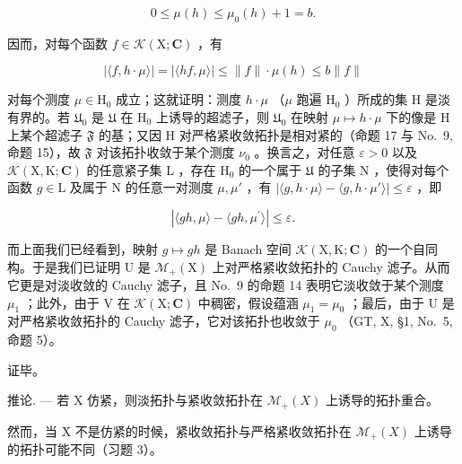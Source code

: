 \[
0 \leqslant \mu (h) \leqslant \mu_ {0} (h) + 1 = b.
\]

因而，对每个函数 \(f \in \mathcal{K}(\mathrm{X};\mathbf{C})\) ，有

\[
| \langle f, h \cdot \mu \rangle | = | \langle h f, \mu \rangle | \leqslant \| f \| \cdot \mu (h) \leqslant b \| f \|
\]

对每个测度 \(\mu\in\mathrm{H}_{0}\) 成立；这就证明：测度 \(h\cdot\mu\) （\(\mu\) 跑遍 \(\mathrm{H}_{0}\) ）所成的集 H 是淡有界的。若 \(\mathfrak{U}_{0}\) 是 \(\mathfrak{U}\) 在 \(\mathrm{H}_{0}\) 上诱导的超滤子，则 \(\mathfrak{U}_{0}\) 在映射 \(\mu\mapsto h\cdot\mu\) 下的像是 H 上某个超滤子 \(\mathfrak{F}\) 的基；又因 H 对严格紧收敛拓扑是相对紧的（命题 17 与 No.~9, 命题 15），故 \(\mathfrak{F}\) 对该拓扑收敛于某个测度 \(\nu_{0}\) 。换言之，对任意 \(\varepsilon>0\) 以及 \(\mathcal{K}(\mathrm{X},\mathrm{K};\mathbf{C})\) 的任意紧子集 L ，存在 \(\mathrm{H}_{0}\) 的一个属于 \(\mathfrak{U}\) 的子集 N ，使得对每个函数 \(g\in\mathrm{L}\) 及属于 N 的任意一对测度 \(\mu,\mu'\) ，有 \(|\langle g,h\cdot\mu\rangle-\langle g,h\cdot\mu'\rangle|\leqslant\varepsilon\) ，即

\[
| \langle g h, \mu \rangle - \langle g h, \mu^ {\prime} \rangle | \leqslant \varepsilon .
\]

而上面我们已经看到，映射 \(g \mapsto gh\) 是 Banach 空间 \(\mathcal{K}(\mathrm{X},\mathrm{K};\mathbf{C})\) 的一个自同构。于是我们已证明 U 是 \(\mathcal{M}_{+}(\mathrm{X})\) 上对严格紧收敛拓扑的 Cauchy 滤子。从而它更是对淡收敛的 Cauchy 滤子，且 No.~9 的命题 14 表明它淡收敛于某个测度 \(\mu_{1}\) ；此外，由于 V 在 \(\mathcal{K}(\mathrm{X};\mathbf{C})\) 中稠密，假设蕴涵 \(\mu_{1} = \mu_{0}\) ；最后，由于 U 是对严格紧收敛拓扑的 Cauchy 滤子，它对该拓扑也收敛于 \(\mu_{0}\) （GT, X, §1, No.~5, 命题 5）。

证毕。

推论. --- 若 X 仿紧，则淡拓扑与紧收敛拓扑在 \(\mathcal{M}_{+}(X)\) 上诱导的拓扑重合。

然而，当 X 不是仿紧的时候，紧收敛拓扑与严格紧收敛拓扑在 \(\mathcal{M}_{+}(X)\) 上诱导的拓扑可能不同（习题 3）。

